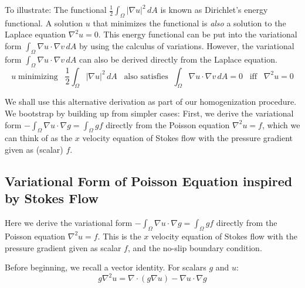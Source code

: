 \documentclass[12pt, a4paper, twoside, openright]{book}
\begin{document}
To illustrate:  The functional $ \frac{1}{2} \int_{\Omega} |\nabla u|^2 \,dA $ 
is known as Dirichlet's energy functional.  A solution $u$ that minimizes the functional is \emph{also} a solution to the Laplace equation $ \nabla^2 u = 0 $.
This energy functional can be put into the variational form $ \int_{\Omega} \nabla u \cdot \nabla v \,dA $ by using the calculus of variations.  However, the variational form $ \int_{\Omega} \nabla u \cdot \nabla v \,dA $ can also be derived directly from the Laplace equation.
\begin{equation}
u \; \text{minimizing} \;\;\; \frac{1}{2} \int_{\Omega} |\nabla u|^2 \,dA
\;\;\; \text{also satisfies} \;\; \int_{\Omega} \nabla u \cdot \nabla v \,dA = 0
\;\;\; \text{iff} \;\;\; \nabla^2 u =0 
\end{equation}

We shall use this alternative derivation as part of our homogenization procedure.
We bootstrap by building up from simpler cases:  First, we derive the variational form $ - \int_{\Omega} \nabla u \cdot \nabla g = \int_{\Omega} g f $ directly from the Poisson equation $ \nabla^2 u = f$, which we can think of as the $x$ velocity equation of Stokes flow with the pressure gradient given as (scalar) $f$.

\subsection{Variational Form of Poisson Equation inspired by Stokes Flow}

Here we derive the variational form $ - \int_{\Omega} \nabla u \cdot \nabla g = \int_{\Omega} g f $ directly from the Poisson equation $ \nabla^2 u = f$.  This is the $x$ velocity equation of Stokes flow with the pressure gradient given as scalar $f$, and the no-slip boundary condition.

Before beginning, we recall a vector identity.  For scalars $g$ and $u$:
\begin{equation}
g \nabla^2 u = \nabla \cdot (g \nabla u) - \nabla u \cdot \nabla g
\end{equation}
\end{document}
